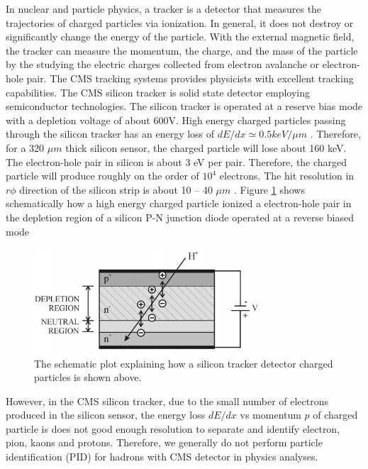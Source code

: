 In nuclear and particle physics, a tracker is a detector that measures the trajectories of charged particles via ionization. In general, it does not destroy or significantly change the energy of the particle. With the external magnetic field, the tracker can measure the momentum, the charge, and the mass of the particle by the studying the electric charges collected from electron avalanche or electron-hole pair. The CMS tracking systems provides physicists with excellent tracking capabilities. The CMS silicon tracker is solid state detector employing semiconductor technologies. The silicon tracker is operated at a reserve bias mode with a depletion voltage of about 600V. High energy charged particles passing through the silicon tracker has an energy loss of $dE/dx \simeq 0.5 keV/\mu m$ \cite{AlphaTheoEx}. Therefore, for a 320 $\mu m$ thick silicon sensor, the charged particle will lose about 160 keV. The electron-hole pair in silicon is about 3 eV per pair. Therefore, the charged particle will produce roughly on the order of $10^4$ electrons. The hit resolution in $r\phi$ direction of the silicon strip is about 10 -- 40 $\mu m$ \cite{CMSTrackComp}. Figure \ref{SiliconDetector} shows schematically how a high energy charged particle ionized a electron-hole pair in the depletion region of a silicon P-N junction diode operated at a reverse biased mode


\begin{figure}[hbtp]
\begin{center}
\includegraphics[width=0.75\textwidth]{Figures/Chapter3/SiliconDetector.png}
\caption{The schematic plot explaining how a silicon tracker detector charged particles is shown above.}
\label{SiliconDetector}
\end{center}
\end{figure} 

However, in the CMS silicon tracker, due to the small number of electrons produced in the silicon sensor, the energy loss $dE/dx$ vs momentum $p$ of charged particle is does not good enough resolution to separate and identify electron, pion, kaons and protons. Therefore, we generally do not perform particle identification (PID) for hadrons with CMS detector in physics analyses.  


